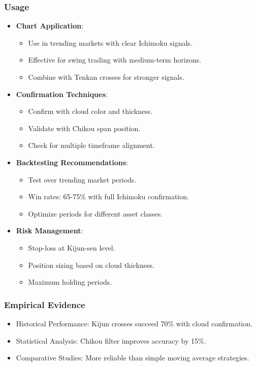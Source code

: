 \documentclass[12pt]{article}
\begin{document}
\subsubsection{Usage}
\begin{itemize}
\item \textbf{Chart Application}:
  \begin{itemize}
  \item Use in trending markets with clear Ichimoku signals.
  \item Effective for swing trading with medium-term horizons.
  \item Combine with Tenkan crosses for stronger signals.
  \end{itemize}
\item \textbf{Confirmation Techniques}:
  \begin{itemize}
  \item Confirm with cloud color and thickness.
  \item Validate with Chikou span position.
  \item Check for multiple timeframe alignment.
  \end{itemize}
\item \textbf{Backtesting Recommendations}:
  \begin{itemize}
  \item Test over trending market periods.
  \item Win rates: 65-75\% with full Ichimoku confirmation.
  \item Optimize periods for different asset classes.
  \end{itemize}
\item \textbf{Risk Management}:
  \begin{itemize}
  \item Stop-loss at Kijun-sen level.
  \item Position sizing based on cloud thickness.
  \item Maximum holding periods.
  \end{itemize}
\end{itemize}

\subsubsection{Empirical Evidence}
\begin{itemize}
\item Historical Performance: Kijun crosses succeed 70\% with cloud confirmation.
\item Statistical Analysis: Chikou filter improves accuracy by 15\%.
\item Comparative Studies: More reliable than simple moving average strategies.
\end{itemize}
\end{document}
